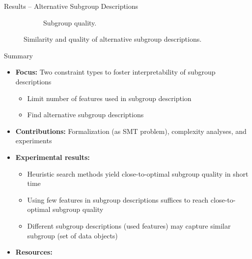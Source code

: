 \documentclass[en, navbaroff]{sdqbeamer}
\begin{document}
\begin{frame}[t]{Results -- Alternative Subgroup Descriptions}
\begin{figure}
\begin{subfigure}[t]{0.4\textwidth}
			\caption{Subgroup quality.}
			\label{fig:csd:alternatives-train-nwracc}
		\end{subfigure}
		\caption*{
			Similarity and quality of alternative subgroup descriptions.
		}
		\label{fig:csd:alternatives:main}
	\end{figure}
\end{frame}

\begin{frame}[t]{Summary}
	\begin{itemize}
		\item \textbf{Focus:} Two constraint types to foster interpretability of subgroup descriptions
		\begin{itemize}
			\item Limit number of features used in subgroup description
			\item Find alternative subgroup descriptions
		\end{itemize}
		\pause
		\vspace{\baselineskip}
		\item \textbf{Contributions:} Formalization (as SMT problem), complexity analyses, and experiments
		\pause
		\vspace{\baselineskip}
		\item \textbf{Experimental results:}
		\begin{itemize}
			\item Heuristic search methods yield close-to-optimal subgroup quality in short time
			\item Using few features in subgroup descriptions suffices to reach close-to-optimal subgroup quality
			\item Different subgroup descriptions (used features) may capture similar subgroup (set of data objects)
		\end{itemize}
		\pause
		\vspace{\baselineskip}
		\item \textbf{Resources:}

\end{itemize}
\end{frame}
\end{document}

